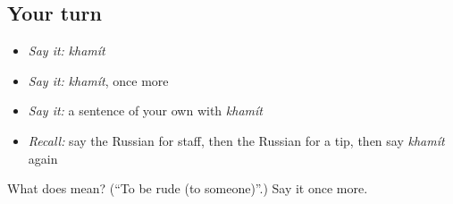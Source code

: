 \subsection*{Your turn}
\begin{itemize}
\raggedright
  \item \emph{Say it:} \emph{khamít}
  \item \emph{Say it:} \emph{khamít}, once more
  \item \emph{Say it:} a sentence of your own with \emph{khamít}
  \item \emph{Recall:} say the Russian for staff, then the Russian for a tip, then say \emph{khamít} again
\end{itemize}

\begin{tcolorbox}[breakable,colback=teal!4,colframe=teal!35!black,title={Before you move on}]
What does  mean? (\textquotedblleft{}To be rude (to someone)\textquotedblright{}.) Say it once more.
\end{tcolorbox}
